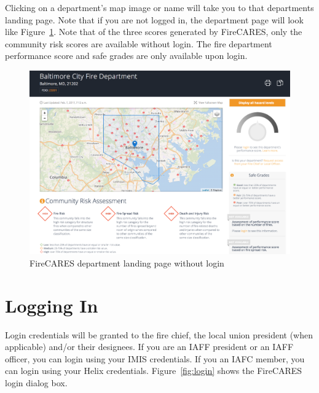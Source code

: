 \documentclass[12pt,oneside]{book}
\begin{document}
\FloatBarrier

Clicking on a department's map image or name will take you to that departments landing page. Note that if you are not logged in, the department page will look like Figure~\ref{fig:department_page_nologin}. Note that of the three scores generated by FireCARES, only the community risk scores are available without login. The fire department performance score and safe grades are only available upon login.

\begin{figure}[ht!]
\centering
\includegraphics[width=.9\columnwidth]{Figures/department_page_logout}
\caption{FireCARES department landing page without login}
\label{fig:department_page_nologin}
\end{figure}

\section{Logging In}

Login credentials will be granted to the fire chief, the local union president (when applicable) and/or their designees. If you are an IAFF president or an IAFF officer, you can login using your IMIS credentials. If you an IAFC member, you can login using your Helix credentials. Figure~\ref{fig:login} shows the FireCARES login dialog box.
\end{document}
